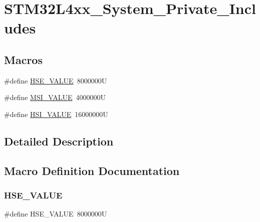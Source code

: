 \hypertarget{group___s_t_m32_l4xx___system___private___includes}{}\section{S\+T\+M32\+L4xx\+\_\+\+System\+\_\+\+Private\+\_\+\+Includes}
\label{group___s_t_m32_l4xx___system___private___includes}
\subsection*{Macros}
\begin{DoxyCompactItemize}
\item 
\#define \mbox{\hyperlink{group___s_t_m32_l4xx___system___private___includes_gaeafcff4f57440c60e64812dddd13e7cb}{H\+S\+E\+\_\+\+V\+A\+L\+UE}}~8000000U
\item 
\#define \mbox{\hyperlink{group___s_t_m32_l4xx___system___private___includes_ga90e2a73d7fe4a7425c6e31fef5ce7263}{M\+S\+I\+\_\+\+V\+A\+L\+UE}}~4000000U
\item 
\#define \mbox{\hyperlink{group___s_t_m32_l4xx___system___private___includes_gaaa8c76e274d0f6dd2cefb5d0b17fbc37}{H\+S\+I\+\_\+\+V\+A\+L\+UE}}~16000000U
\end{DoxyCompactItemize}


\subsection{Detailed Description}


\subsection{Macro Definition Documentation}
\mbox{\label{group___s_t_m32_l4xx___system___private___includes_gaeafcff4f57440c60e64812dddd13e7cb}} 
\subsubsection{\texorpdfstring{H\+S\+E\+\_\+\+V\+A\+L\+UE}{HSE\_VALUE}}
{\footnotesize\ttfamily \#define H\+S\+E\+\_\+\+V\+A\+L\+UE~8000000U}

